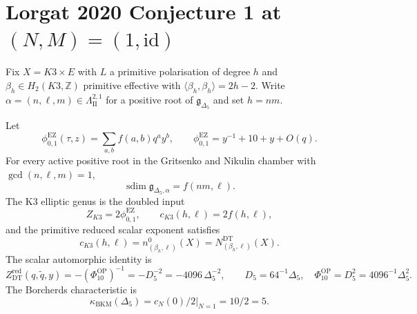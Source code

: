 \section{Lorgat 2020 Conjecture 1 at \texorpdfstring{$(N,M)=(1,\mathrm{id})$}{(N,M)=(1,id)}}
\label{wn:sec:lorgat-conj1-N1-complete-proof}

\providecommand{\kBKM}{\kappa_{\mathrm{BKM}}}
\providecommand{\kcat}{\kappa_{\mathrm{cat}}}
\providecommand{\kch}{\kappa_{\mathrm{ch}}}
\providecommand{\kfib}{\kappa_{\mathrm{fiber}}}
\providecommand{\phiEZ}{\phi_{0,1}^{\mathrm{EZ}}}
\providecommand{\gDelta}{\mathfrak{g}_{\Delta_5}}
\providecommand{\ZDTred}{Z^{\mathrm{red}}_{\mathrm{DT}}}
\providecommand{\Dfive}{D_5}
\providecommand{\PhiOP}{\Phi_{10}^{\mathrm{OP}}}
\providecommand{\Sp}{\operatorname{Sp}}
\providecommand{\Aut}{\operatorname{Aut}}

Fix $X=K3\times E$ with $L$ a primitive polarisation of degree $h$ and
$\beta_h\in H_2(K3,\mathbb Z)$ primitive effective with
$\langle\beta_h,\beta_h\rangle=2h-2$.  Write
$\alpha=(n,\ell,m)\in\Lambda^{2,1}_{\mathrm{II}}$ for a positive root of
$\gDelta$ and set $h=nm$.

\begin{theorem}[The primitive $N=1$ denominator and scalar square]
\label{thm:lorgat-conj1-N1-complete}
Let
\[
  \phiEZ(\tau,z)=\sum_{a,b} f(a,b)q^a y^b,
  \qquad
  \phiEZ=y^{-1}+10+y+O(q).
\]
For every active positive root in the Gritsenko and Nikulin chamber with
$\gcd(n,\ell,m)=1$,
\[
  \operatorname{sdim}\mathfrak g_{\Delta_5,\alpha}=f(nm,\ell).
\]
The K3 elliptic genus is the doubled input
\[
  Z_{K3}=2\phiEZ,\qquad c_{K3}(h,\ell)=2f(h,\ell),
\]
and the primitive reduced scalar exponent satisfies
\[
  c_{K3}(h,\ell)
  =
  n^{0}_{(\beta_h,\ell)}(X)
  =
  N^{\mathrm{DT}}_{(\beta_h,\ell)}(X).
\]
The scalar automorphic identity is
\begin{equation}
\label{eq:OP-igusa-N1-normalized}
  \ZDTred(q,\tilde q,y)
  =
  -(\PhiOP)^{-1}
  =
  -\Dfive^{-2}
  =
  -4096\,\Delta_5^{-2},
  \qquad
  \Dfive=64^{-1}\Delta_5,\quad
  \PhiOP=\Dfive^2=4096^{-1}\Delta_5^2.
\end{equation}
The Borcherds characteristic is
\[
  \kBKM(\Delta_5)=\left.c_N(0)/2\right|_{N=1}=10/2=5.
\]
\end{theorem}

